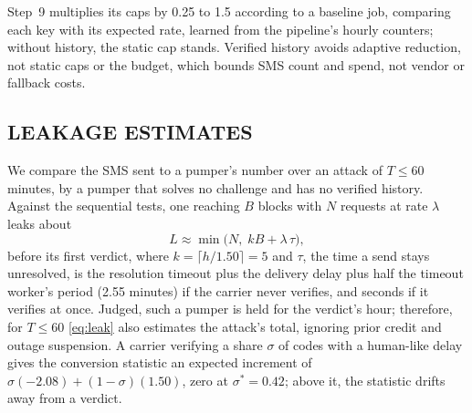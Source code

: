 \documentclass{IEEEoj}
\begin{document}
Step~9 multiplies its caps by 0.25 to 1.5 according to a baseline job, comparing each key with its expected rate, learned from the pipeline's hourly counters; without history, the static cap stands. Verified history avoids adaptive reduction, not static caps or the budget, which bounds SMS count and spend, not vendor or fallback costs.

\subsection{LEAKAGE ESTIMATES}
\label{sec:model}

We compare the SMS sent to a pumper's number over an attack of $T \le 60$ minutes, by a pumper that solves no challenge and has no verified history. Against the sequential tests, one reaching $B$ blocks with $N$ requests at rate $\lambda$ leaks about
\begin{equation}
L \approx \min\bigl(N,\; kB + \lambda\,\tau\bigr),
\label{eq:leak}
\end{equation}
before its first verdict, where $k = \lceil h/1.50 \rceil = 5$ and $\tau$, the time a send stays unresolved, is the resolution timeout plus the delivery delay plus half the timeout worker's period (2.55 minutes) if the carrier never verifies, and seconds if it verifies at once. Judged, such a pumper is held for the verdict's hour; therefore, for $T \le 60$ \eqref{eq:leak} also estimates the attack's total, ignoring prior credit and outage suspension. A carrier verifying a share $\sigma$ of codes with a human-like delay gives the conversion statistic an expected increment of $\sigma(-2.08) + (1-\sigma)(1.50)$, zero at $\sigma^{*} = 0.42$; above it, the statistic drifts away from a verdict.
\end{document}
